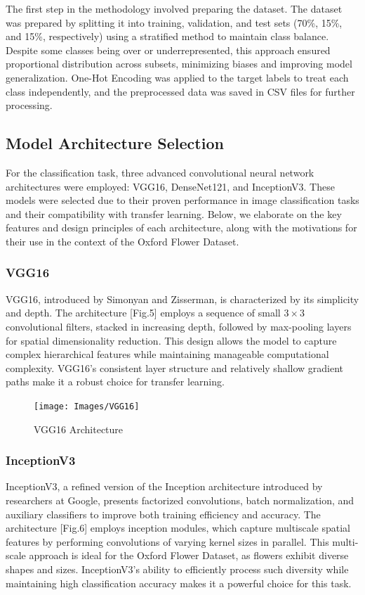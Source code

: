 The first step in the methodology involved preparing the dataset. The dataset was prepared by splitting it into
training, validation, and test sets (70\%, 15\%, and 15\%, respectively) using a stratified method to maintain class
balance. Despite some classes being over or underrepresented, this approach ensured proportional distribution across
subsets, minimizing biases and improving model generalization. One-Hot Encoding was applied to the target labels to
treat each class independently, and the preprocessed data was saved in CSV files for further processing.

\subsection{Model Architecture Selection}

For the classification task, three advanced convolutional neural network architectures were employed: VGG16,
DenseNet121, and InceptionV3. These models were selected due to their proven performance in image
classification tasks and their compatibility with transfer learning. Below, we elaborate on the key features and design
principles of each architecture, along with the motivations for their use in the context of the Oxford Flower Dataset.

\subsubsection*{VGG16}
VGG16, introduced by Simonyan and Zisserman, is characterized by its simplicity and depth. The architecture [Fig.5] employs a
sequence of small $3 \times 3$ convolutional filters, stacked in increasing depth, followed by max-pooling layers for
spatial dimensionality reduction. This design allows the model to capture complex hierarchical features while
maintaining manageable computational complexity. VGG16's consistent layer structure and relatively shallow gradient
paths make it a robust choice for transfer learning.

\begin{figure}[h!]
    \centering
    \texttt{[image: Images/VGG16]}
    \caption{VGG16 Architecture}
\end{figure}

\subsubsection*{InceptionV3}
InceptionV3, a refined version of the Inception architecture introduced by researchers at Google, presents factorized
convolutions, batch normalization, and auxiliary classifiers to improve both training efficiency and accuracy.
The architecture [Fig.6] employs inception modules, which capture multiscale spatial features by performing convolutions of
varying kernel sizes in parallel. This multi-scale approach is ideal for the Oxford Flower Dataset, as flowers exhibit
diverse shapes and sizes. InceptionV3's ability to efficiently process such diversity while maintaining high
classification accuracy makes it a powerful choice for this task.


